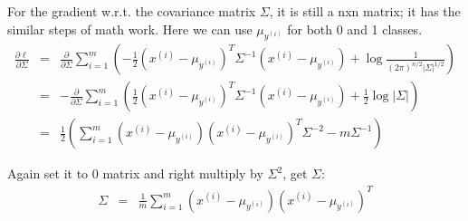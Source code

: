 \begin{answer}
For the gradient w.r.t. the covariance matrix $\Sigma$, it is still a nxn matrix; 
it has the similar steps of math work. Here we can use $\mu_{y^{(i)}}$ for both 0 and 1 classes. 
\begin{eqnarray*}
\frac{\partial \ell}{\partial \Sigma}
	&=& \frac{\partial}{\partial \Sigma} \sum_{i=1}^m \left( -\frac{1}{2}(x^{(i)}-\mu_{y^{(i)}})^T \Sigma^{-1} (x^{(i)}-\mu_{y^{(i)}}) 
		+ \log {\frac{1}{(2\pi)^{n/2} |\Sigma|^{1/2}} }\right ) \\
	&=& -\frac{\partial}{\partial \Sigma} \sum_{i=1}^m \left( \frac{1}{2}(x^{(i)}-\mu_{y^{(i)}})^T \Sigma^{-1} (x^{(i)}-\mu_{y^{(i)}}) 
		+ \frac{1}{2} \log {|\Sigma|}\right ) \\
	&=& \frac{1}{2} \left (\sum_{i=1}^m (x^{(i)}-\mu_{y^{(i)}})(x^{(i)}-\mu_{y^{(i)}})^T\Sigma^{-2} - m \Sigma^{-1} \right )
\end{eqnarray*}

Again set it to 0 matrix and right multiply by $\Sigma^2$, get $\Sigma$:
\begin{eqnarray*}
\Sigma &=& \frac{1}{m} \sum_{i=1}^m (x^{(i)} - \mu_{y^{(i)}}) (x^{(i)} - \mu_{y^{(i)}})^T
\end{eqnarray*}

\end{answer}
